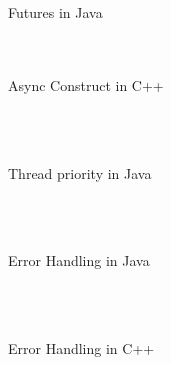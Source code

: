 \documentclass[]{report}
\begin{document}
\chapter{}
\begin{figure}[h!]
	\caption{Futures in Java}
	\begin{lstlisting}[language=Java,frame=single]

	\end{lstlisting}
\end{figure}

\chapter{}
\begin{figure}[h!]
	\caption{Async Construct in C++}
	\begin{lstlisting}[language=C++,frame=single]

	\end{lstlisting}
\end{figure}

\chapter{}
\begin{figure}[h!]
	\caption{Thread priority in Java}
	\begin{lstlisting}[language=Java,frame=single]
	
	\end{lstlisting}
\end{figure}

\chapter{}
\begin{figure}[h!]
	\caption{Error Handling in Java}
	\begin{lstlisting}[language=Java,frame=single]
	
	\end{lstlisting}
\end{figure}


\chapter{}
\begin{figure}[h!]
	\caption{Error Handling in C++}
	\begin{lstlisting}[language=C++,frame=single]
	
	\end{lstlisting}
\end{figure}
\end{document}
